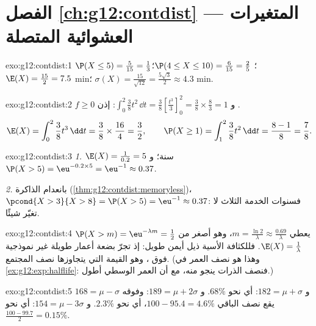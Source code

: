 \section*{الفصل \ref{ch:g12:contdist} --- المتغيرات العشوائية المتصلة}

\begin{solution}{exo:g12:contdist:1}
$\P(X \leq 5) = \frac{5}{15} = \frac13$؛
$\P(4 \leq X \leq 10) = \frac{6}{15} = \frac25$؛
$\E(X) = \frac{15}{2} = 7.5$ min؛
$\sigma(X) = \frac{15}{\sqrt{12}} = \frac{5\sqrt3}{2} \approx 4.3$ min.
\end{solution}

\begin{solution}{exo:g12:contdist:2}
$f \geq 0$ و
$\int_0^2 \frac38 t^2\,\dd t = \frac38\left[\frac{t^3}{3}\right]_0^2
= \frac38 \times \frac83 = 1$: إذن .
\[
\E(X) = \int_0^2 \frac38 t^3\,\dd t = \frac38 \times \frac{16}{4} = \frac32,
\qquad
\P(X \geq 1) = \int_1^2 \frac38 t^2\,\dd t = \frac{8 - 1}{8} = \frac78 .
\]
\end{solution}

\begin{solution}{exo:g12:contdist:3}
\emph{1.} $\E(X) = \frac{1}{0.2} = 5$ سنة؛
و $\P(X > 5) = \eu^{-0.2\times5} = \eu^{-1} \approx 0.37$.

\emph{2.} بانعدام الذاكرة (\cref{thm:g12:contdist:memoryless})،
$\pcond{X > 3}{X > 8} = \P(X > 5) = \eu^{-1} \approx 0.37$: فسنوات الخدمة
الثلاث لا تغيّر شيئًا.
\end{solution}

\begin{solution}{exo:g12:contdist:4}
$\P(X > m) = \eu^{-\lambda m} = \frac12$ يعطي
$m = \frac{\ln 2}{\lambda} \approx \frac{0.69}{\lambda}$، وهو أصغر من
$\E(X) = \frac1\lambda$. فللكثافة الأسية ذيل أيمن طويل: إذ
تجرّ بضعة أعمار طويلة غير نموذجية \emph{} فوق
\emph{}، وهو القيمة التي يتجاوزها نصف المجتمع. (وهذا هو
نصف العمر في \cref{ex:g12:exp:halflife}: فنصف الذرات ينجو منه، مع
أن العمر الوسطي أطول.)
\end{solution}

\begin{solution}{exo:g12:contdist:5}
$168 = \mu - \sigma$ و $182 = \mu + \sigma$: أي نحو $68\%$.
و $189 = \mu + 2\sigma$: وفوقه يقع نصف الباقي
$100 - 95.4 = 4.6\%$، أي نحو $2.3\%$.
و $154 = \mu - 3\sigma$: أي نحو $\frac{100 - 99.7}{2} = 0.15\%$.
\end{solution}


